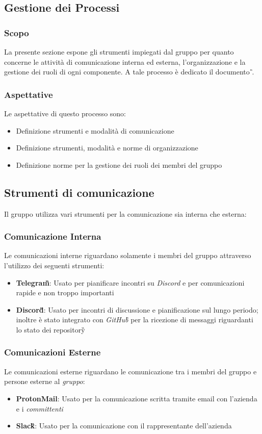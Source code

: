 \subsection{Gestione dei Processi} %
\subsubsection{Scopo}
La presente sezione espone gli strumenti impiegati dal gruppo \teamname{} per quanto concerne le attività di comunicazione interna ed esterna, l'organizzazione e la gestione dei ruoli di ogni componente.
A tale processo è dedicato il documento \PdP{}\textit{\G}.

\subsubsection{Aspettative}
Le aspettative di questo processo sono:
\begin{itemize}
	\item Definizione strumenti e modalità di comunicazione
	\item Definizione strumenti, modalità e norme di organizzazione
	\item Definizione norme per la gestione dei ruoli dei membri del gruppo
\end{itemize}

\subsection{Strumenti di comunicazione}
Il gruppo \teamname{} utilizza vari strumenti per la comunicazione sia interna che esterna:
	\subsubsection{Comunicazione Interna}
		Le comunicazioni interne riguardano solamente i membri del gruppo \teamname{} attraverso l'utilizzo dei seguenti strumenti:
			\begin{itemize}
				\item \textbf{Telegram\G}: Usato per pianificare incontri su \emph{Discord} e per comunicazioni rapide e non troppo importanti
				\item \textbf{Discord\G}: Usato per incontri di discussione e pianificazione sul lungo periodo; inoltre è stato integrato con \emph{GitHub\G{}} per la ricezione di messaggi riguardanti lo stato dei repository\G
			\end{itemize}
	\subsubsection{Comunicazioni Esterne}
	\label{sec:Comunicazioni Esterne}
		Le comunicazioni esterne riguardano le comunicazione tra i membri del gruppo \teamname e persone esterne al \emph{gruppo}:
			\begin{itemize}
				\item \textbf{ProtonMail}: Usato per la comunicazione scritta tramite email con l'azienda \proponente e i \emph{committenti}
				\item \textbf{Slack\G}: Usato per la comunicazione con il rappresentante dell'azienda \proponente
			\end{itemize}
		
